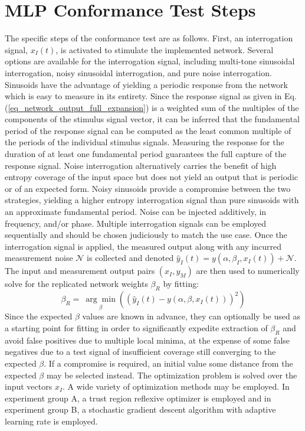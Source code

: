 \section{MLP Conformance Test Steps}
\label{section_equivalency_test_steps}
The specific steps of the conformance test are as
follows. First, an interrogation signal, $x_I(t)$,
is activated to stimulate the implemented network.  Several options are
available for the interrogation signal, including multi-tone sinusoidal
interrogation, noisy sinusoidal interrogation, and pure noise interrogation.
Sinusoids have the advantage of yielding a periodic response from the network
which is easy to measure in its entirety.  Since the response signal as given in Eq. 
(\ref{eq_network_output_full_expansion}) is a weighted sum of the multiples of the
components of the stimulus signal vector, it can be inferred that the fundamental
period of the response signal can be computed as the least common multiple of
the periods of the individual stimulus signals.  Measuring the response for
the duration of at least one fundamental period guarantees the full capture of the response signal.
Noise interrogation alternatively carries the benefit of high entropy coverage
of the input space but does not yield an output that is periodic or of an expected
form.  Noisy sinusoids provide a compromise between the two strategies, yielding
a higher entropy interrogation signal than pure sinusoids with an approximate fundamental
period. Noise can be injected additively, in frequency, and/or phase.  
Multiple interrogation signals can be employed sequentially and should be
chosen judiciously to match the use case.  Once the interrogation signal is applied,
the measured output along with any incurred measurement
noise $\mathcal{N}$ is collected and denoted
$\hat{y}_I(t) = y\left(\alpha, \beta_I, x_I(t)\right) + \mathcal{N}.$
The input and measurement output pairs $\left(x_I, y_M\right)$ are
then used to numerically solve for the replicated network weights
$\beta_{R}$ by fitting:
\begin{equation}
	\label{eq_optimization_for_replicated_network}
	\beta_R = \
	\underset{\beta}{\arg\min}\left(
	\left(\hat{y}_I(t) - y\left(\alpha, \beta, x_I(t)\right)\right)^2
	\right)
\end{equation}
Since the expected $\beta$ values are known in advance, they can optionally be
used as a starting point for fitting in order to significantly expedite extraction of $\beta_R$
and avoid false positives due to multiple local minima, at the expense of
some false negatives due to a test signal of insufficient coverage
still converging to the expected $\beta$.  If a compromise is required, an initial
value some distance from the expected $\beta$ may be selected instead.
The optimization problem is solved over the input vectors $x_I$.  A wide variety of
optimization methods may be employed.  In experiment group A, a trust region reflexive
optimizer is employed and in experiment group B, a stochastic gradient descent algorithm
with adaptive learning rate is employed.

